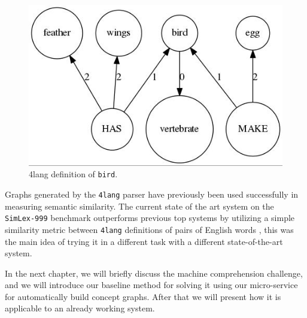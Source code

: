 \begin{figure}[!htb]
	\centering
	\includegraphics[scale=0.5]{figures/bird}
	\caption{4lang definition of \texttt{bird}.}
	\label{fig:bird}
\end{figure}

Graphs generated by the \texttt{4lang} parser have previously been used
successfully in measuring semantic similarity. The current state of the
art system on the \texttt{SimLex-999} benchmark \cite{Hill:2014a}
outperforms previous top systems by utilizing a simple similarity metric
between \texttt{4lang} definitions of pairs of English words
\cite{Recski:2016c}, this was the main idea of trying it in a different task with a different state-of-the-art system.

In the next chapter, we will briefly discuss the machine comprehension challenge, and we will introduce our baseline method for solving it using our micro-service for automatically build concept graphs. After that we will present how it is applicable to an already working system.